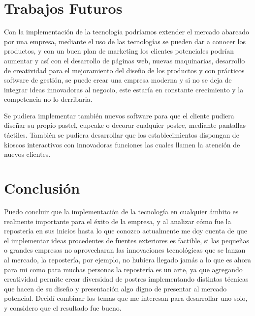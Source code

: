 \documentclass{bmcart}
\begin{document}
\section{Trabajos Futuros}


Con la implementación de la tecnología podríamos extender el mercado abarcado por una empresa, mediante el uso de las tecnologías se pueden dar a conocer los productos, y con un buen plan de marketing los clientes potenciales podrían aumentar y así con el desarrollo de páginas web, nuevas maquinarias, desarrollo de creatividad para el mejoramiento del diseño de los productos y con prácticos software de gestión, se puede crear una empresa moderna y si no se deja de integrar ideas innovadoras al negocio, este estaría en constante crecimiento y la competencia no lo derribaria. 

Se pudiera implementar también nuevos software para que el cliente pudiera diseñar su propio pastel, cupcake o decorar cualquier postre, mediante pantallas táctiles.
También se pudiera desarrollar que los establecimientos dispongan de kioscos interactivos con innovadoras funciones las cuales llamen la atención de nuevos clientes.

\section{Conclusión}
Puedo concluir que la implementación de la tecnología en cualquier ámbito es realmente importante para el éxito de la empresa, y al analizar cómo fue la repostería en sus inicios hasta lo que conozco actualmente me doy cuenta de que el implementar ideas procedentes de fuentes exteriores es factible, si las pequeñas o grandes empresas no aprovecharan las innovaciones tecnológicas que se lanzan al mercado, la repostería, por ejemplo, no hubiera llegado jamás a lo que es ahora para mi como para muchas personas la repostería es un arte, ya que agregando creatividad permite crear diversidad de postres implementando distintas técnicas que hacen de su diseño y presentación algo digno de presentar al mercado potencial.
\newline
\newline
Decidí combinar los temas que me interesan para desarrollar uno solo, y considero que el resultado fue bueno.


\end{document}
